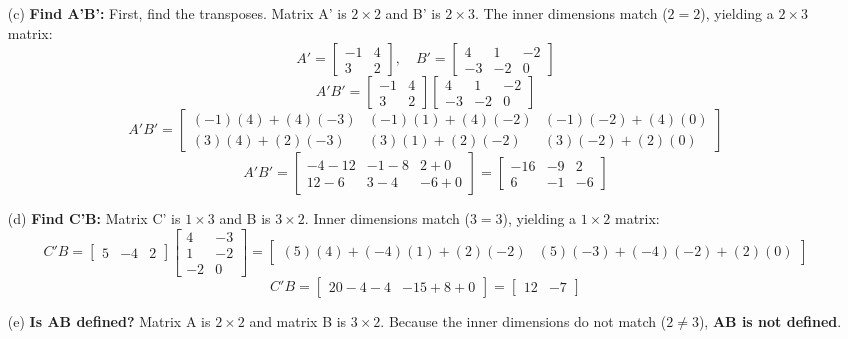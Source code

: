 \documentclass[11pt,letterpaper]{article}
\begin{document}
\begin{enumerate}
    \item[(c)] \textbf{Find A'B':}
    First, find the transposes. Matrix A' is $2 \times 2$ and B' is $2 \times 3$. The inner dimensions match ($2 = 2$), yielding a $2 \times 3$ matrix:
    $$A' = \begin{bmatrix} -1 & 4 \\ 3 & 2 \end{bmatrix}, \quad B' = \begin{bmatrix} 4 & 1 & -2 \\ -3 & -2 & 0 \end{bmatrix}$$
    $$A'B' = \begin{bmatrix} -1 & 4 \\ 3 & 2 \end{bmatrix} \begin{bmatrix} 4 & 1 & -2 \\ -3 & -2 & 0 \end{bmatrix}$$
    $$A'B' = \begin{bmatrix} (-1)(4) + (4)(-3) & (-1)(1) + (4)(-2) & (-1)(-2) + (4)(0) \\ (3)(4) + (2)(-3) & (3)(1) + (2)(-2) & (3)(-2) + (2)(0) \end{bmatrix}$$
    $$A'B' = \begin{bmatrix} -4 - 12 & -1 - 8 & 2 + 0 \\ 12 - 6 & 3 - 4 & -6 + 0 \end{bmatrix} = \begin{bmatrix} -16 & -9 & 2 \\ 6 & -1 & -6 \end{bmatrix}$$

    \item[(d)] \textbf{Find C'B:}
    Matrix C' is $1 \times 3$ and B is $3 \times 2$. Inner dimensions match ($3 = 3$), yielding a $1 \times 2$ matrix:
    $$C'B = \begin{bmatrix} 5 & -4 & 2 \end{bmatrix} \begin{bmatrix} 4 & -3 \\ 1 & -2 \\ -2 & 0 \end{bmatrix} = \begin{bmatrix} (5)(4) + (-4)(1) + (2)(-2) & (5)(-3) + (-4)(-2) + (2)(0) \end{bmatrix}$$
    $$C'B = \begin{bmatrix} 20 - 4 - 4 & -15 + 8 + 0 \end{bmatrix} = \begin{bmatrix} 12 & -7 \end{bmatrix}$$

    \item[(e)] \textbf{Is AB defined?}
    Matrix A is $2 \times 2$ and matrix B is $3 \times 2$. Because the inner dimensions do not match ($2 \neq 3$), \textbf{AB is not defined}.
\end{enumerate}
\end{document}
